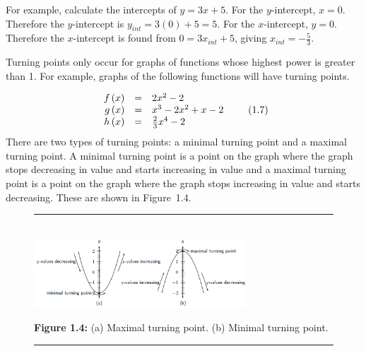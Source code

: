         \label{m39337*id236442}For example, calculate the intercepts of $y=3x+5$. For the $y$-intercept, $x=0$. Therefore the $y$-intercept is ${y}_{int}=3\left(0\right)+5=5$. For the $x$-intercept, $y=0$. Therefore the $x$-intercept is found from $0=3{x}_{int}+5$, giving ${x}_{int}=-\frac{5}{3}$.\par 
      \label{m39337*uid47}
            \nopagebreak
        \label{m39337*id236645}Turning points only occur for graphs of functions whose highest power is greater than 1. For example, graphs of the following functions will have turning points.\par 
        \label{m39337*id236652}\nopagebreak\noindent{}
          
    \begin{equation}
    \begin{array}{ccc}\hfill f\left(x\right)& =& 2{x}^{2}-2\hfill \\ \hfill g\left(x\right)& =& {x}^{3}-2{x}^{2}+x-2\hfill \\ \hfill h\left(x\right)& =& \frac{2}{3}{x}^{4}-2\hfill \end{array}\tag{1.7}
      \end{equation}
        \label{m39337*id236788}There are two types of turning points: a minimal turning point and a maximal turning point. A minimal turning point is a point on the graph where the graph stops decreasing in value and starts increasing in value and a maximal turning point is a point on the graph where the graph stops increasing in value and starts decreasing. These are shown in Figure~1.4.\par 
    \setcounter{subfigure}{0}
	\begin{figure}[H] %
    \begin{center}
    \rule[.1in]{\figurerulewidth}{.005in} \\
        \label{m39337*uid48!!!underscore!!!media}\label{m39337*uid48!!!underscore!!!printimage}\includegraphics[width=300px]{col11306.imgs/m39337_MG10C11_035.png} %
      \vspace{2pt}
    \vspace{\rubberspace}\par \begin{cnxcaption}
	  \small \textbf{Figure 1.4: }(a) Maximal turning point. (b) Minimal turning point.
	\end{cnxcaption}
    \vspace{.1in}
    \rule[.1in]{\figurerulewidth}{.005in} \\
    \end{center}
 \end{figure}       
